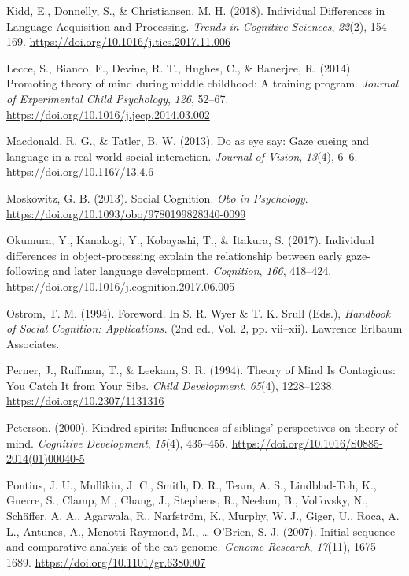 \documentclass[
]{scrbook}
\newlength{\cslhangindent}
\newenvironment{CSLReferences}[2] %
 {\begin{list}{}{%
  \setlength{\itemindent}{0pt}
  \setlength{\leftmargin}{0pt}
  \setlength{\parsep}{0pt}
  \ifodd #1
   \setlength{\leftmargin}{\cslhangindent}
   \setlength{\itemindent}{-1\cslhangindent}
  \fi
  \setlength{\itemsep}{#2\baselineskip}}}
 {\end{list}}
\begin{document}
\begin{CSLReferences}{1}{0}
Kidd, E., Donnelly, S., \& Christiansen, M. H. (2018). Individual {Differences} in {Language Acquisition} and {Processing}. \emph{Trends in Cognitive Sciences}, \emph{22}(2), 154--169. \url{https://doi.org/10.1016/j.tics.2017.11.006}

Lecce, S., Bianco, F., Devine, R. T., Hughes, C., \& Banerjee, R. (2014). Promoting theory of mind during middle childhood: {A} training program. \emph{Journal of Experimental Child Psychology}, \emph{126}, 52--67. \url{https://doi.org/10.1016/j.jecp.2014.03.002}

Macdonald, R. G., \& Tatler, B. W. (2013). Do as eye say: {Gaze} cueing and language in a real-world social interaction. \emph{Journal of Vision}, \emph{13}(4), 6--6. \url{https://doi.org/10.1167/13.4.6}

Moskowitz, G. B. (2013). Social {Cognition}. \emph{Obo in Psychology}. \url{https://doi.org/10.1093/obo/9780199828340-0099}

Okumura, Y., Kanakogi, Y., Kobayashi, T., \& Itakura, S. (2017). Individual differences in object-processing explain the relationship between early gaze-following and later language development. \emph{Cognition}, \emph{166}, 418--424. \url{https://doi.org/10.1016/j.cognition.2017.06.005}

Ostrom, T. M. (1994). Foreword. In S. R. Wyer \& T. K. Srull (Eds.), \emph{Handbook of {Social Cognition}: {Applications}.} (2nd ed., Vol. 2, pp. vii--xii). Lawrence Erlbaum Associates.

Perner, J., Ruffman, T., \& Leekam, S. R. (1994). Theory of {Mind Is Contagious}: {You Catch It} from {Your Sibs}. \emph{Child Development}, \emph{65}(4), 1228--1238. \url{https://doi.org/10.2307/1131316}

Peterson. (2000). Kindred spirits: {Influences} of siblings' perspectives on theory of mind. \emph{Cognitive Development}, \emph{15}(4), 435--455. \url{https://doi.org/10.1016/S0885-2014(01)00040-5}

Pontius, J. U., Mullikin, J. C., Smith, D. R., Team, A. S., Lindblad-Toh, K., Gnerre, S., Clamp, M., Chang, J., Stephens, R., Neelam, B., Volfovsky, N., Schäffer, A. A., Agarwala, R., Narfström, K., Murphy, W. J., Giger, U., Roca, A. L., Antunes, A., Menotti-Raymond, M., \ldots{} O'Brien, S. J. (2007). Initial sequence and comparative analysis of the cat genome. \emph{Genome Research}, \emph{17}(11), 1675--1689. \url{https://doi.org/10.1101/gr.6380007}


\end{CSLReferences}
\end{document}
